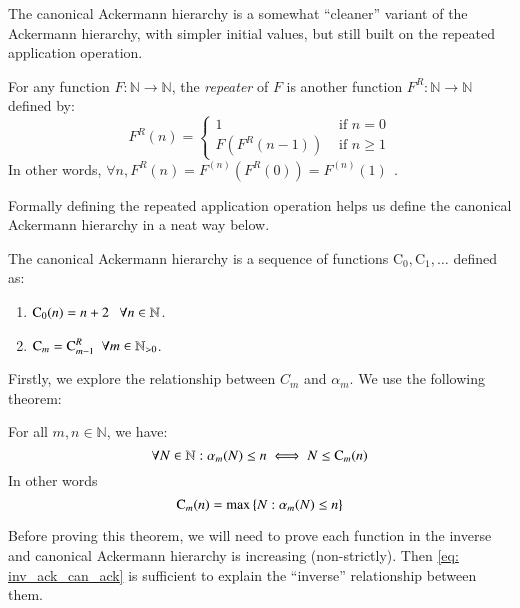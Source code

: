 The canonical Ackermann hierarchy is a somewhat ``cleaner'' 
variant of the Ackermann hierarchy, with simpler initial 
values, but still built on the repeated application operation.

\begin{defn} \label{defn: rep_app}
For any function $F: \mathbb{N} \to \mathbb{N}$, the 
\textit{repeater} of $F$ is another function $F^R : 
\mathbb{N} \to \mathbb{N}$ defined by:
\begin{equation}
F^R(n) = \begin{cases}
1 & \text{ if } n = 0 \\ F\left(F^R(n - 1)\right) & \text{ if } n \ge 1
\end{cases}
\end{equation}
In other words, $\forall n, F^R(n) = F^{(n)}\left(F^R(0)\right) = F^{(n)}(1) \ \ $.
\end{defn}

Formally defining the repeated application operation 
helps us define the canonical Ackermann hierarchy in 
a neat way below.

\begin{defn} \label{defn: can_ack_hier}
The canonical Ackermann hierarchy is a sequence of 
functions $\text{C}_0, \text{C}_1, \ldots $ defined as:
\begin{enumerate}
	\item $\text{C}_0(n) = n + 2 \ \ \ \forall n\in \mathbb{N}$.
	\item $\text{C}_m = \text{C}_{m-1}^R \ \ \forall m\in \mathbb{N}_{>0}$.
\end{enumerate}
\end{defn}

Firstly, we explore the relationship between $C_m$ and 
$\alpha_m$. We use the following theorem:

\begin{thm} \label{thm: inv_ack_can_ack}
For all $m, n \in \mathbb{N}$, we have:
\begin{equation} \label{eq: inv_ack_can_ack}
\forall N \in \mathbb{N}: \alpha_m(N) \le n \iff N \le \text{C}_m(n)
\end{equation}
In other words
\begin{equation} \label{eq: inv_ack_can_ack_0}
\text{C}_m(n) = \max\left\{N : \alpha_m(N) \le n\right\}
\end{equation}
\end{thm}

Before proving this theorem, we will need to prove each 
function in the inverse and canonical Ackermann hierarchy 
is increasing (non-strictly). Then \eqref{eq: inv_ack_can_ack} 
is sufficient to explain the ``inverse'' relationship between them.

